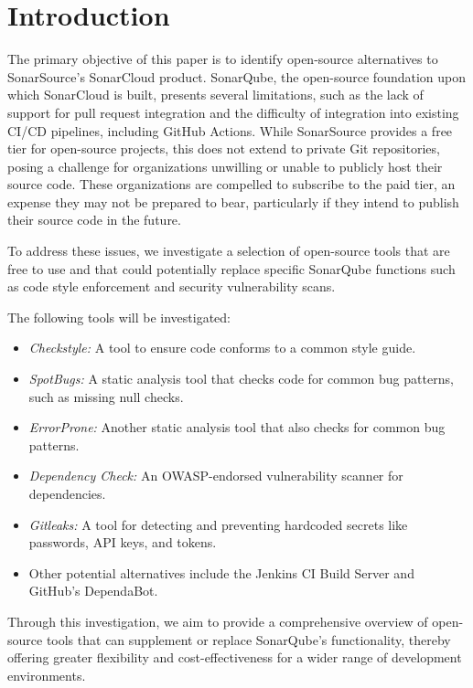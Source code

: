 \section{Introduction}\label{sec:introduction}

The primary objective of this paper is to identify open-source alternatives to SonarSource's SonarCloud product.
SonarQube, the open-source foundation upon which SonarCloud is built, presents several limitations, such as the lack of support for pull request integration and the difficulty of integration into existing CI/CD pipelines, including GitHub Actions.
While SonarSource provides a free tier for open-source projects, this does not extend to private Git repositories, posing a challenge for organizations unwilling or unable to publicly host their source code.
These organizations are compelled to subscribe to the paid tier, an expense they may not be prepared to bear, particularly if they intend to publish their source code in the future.

To address these issues, we investigate a selection of open-source tools that are free to use and that could potentially replace specific SonarQube functions such as code style enforcement and security vulnerability scans.

The following tools will be investigated:
\begin{itemize}
    \item \textit{Checkstyle:} A tool to ensure code conforms to a common style guide.
    \item \textit{SpotBugs:} A static analysis tool that checks code for common bug patterns, such as missing null checks.
    \item \textit{ErrorProne:} Another static analysis tool that also checks for common bug patterns.
    \item \textit{Dependency Check:} An OWASP-endorsed vulnerability scanner for dependencies.
    \item \textit{Gitleaks:} A tool for detecting and preventing hardcoded secrets like passwords, API keys, and tokens.
    \item Other potential alternatives include the Jenkins CI Build Server and GitHub's DependaBot.
\end{itemize}

Through this investigation, we aim to provide a comprehensive overview of open-source tools that can supplement or replace SonarQube's functionality, thereby offering greater flexibility and cost-effectiveness for a wider range of development environments.